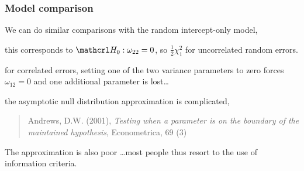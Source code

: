 \documentclass{beamer}
\begin{document}
\begin{frame}
\frametitle{Model comparison}
\bi \item 
 We can do similar comparisons with the random intercept-only model,
 \bi \item this corresponds to $\Hy_0: \omega_{22}=0$, so $\frac{1}{2}\chi^2_1$ for uncorrelated random errors.
 \item for correlated errors, setting one of the two variance parameters to zero forces $\omega_{12}=0$ and one additional parameter is lost\ldots
 \item the asymptotic null distribution approximation is complicated, 
 \begin{quote} Andrews, D.W. (2001), \textsl{Testing when a parameter is on the boundary of the maintained hypothesis}, Econometrica, 69 (3)
  \end{quote}
The approximation is also poor \ldots most people thus resort to the use of information criteria.
 \ei
 \ei
\end{frame}
\end{document}
